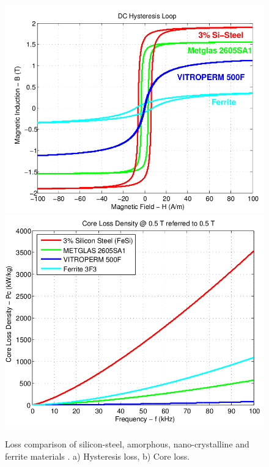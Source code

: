 \documentclass[a4paper, 11pt]{article} %
\begin{document}
\begin{figure}[]
  \centering
    \includegraphics[scale=0.3]{hysteresis-losses}
    \includegraphics[scale=0.3]{core-loss}
  \caption{Loss comparison of silicon-steel, amorphous, nano-crystalline and ferrite materials \cite{Villar2010}. a) Hysteresis loss, b) Core loss.}
  \label{core-loss}
\end{figure}
\end{document}

